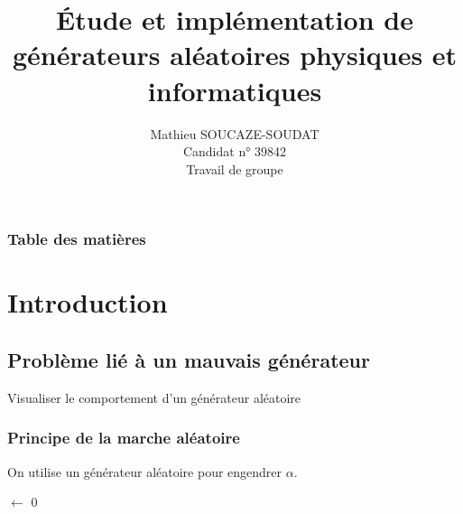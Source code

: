 \documentclass[aspectratio=43]{beamer}
\title{Étude et implémentation de générateurs aléatoires physiques et informatiques}
\author{Mathieu SOUCAZE-SOUDAT\\Candidat n° 39842\\Travail de groupe}
\date{}
\begin{document}
\frame{\titlepage}

\begin{frame}
    \begin{center}
        \frametitle{Table des matières}
        \tableofcontents
    \end {center}
\end{frame}

\section{Introduction}
    \subsection{Problème lié à un mauvais générateur}
    \begin{frame}
        \center
        \Huge
        Visualiser le comportement d'un générateur aléatoire
    \end{frame}
    \begin{frame}
        \frametitle{Principe de la marche aléatoire}
        \center
        On utilise un générateur aléatoire pour engendrer $\alpha$.
        \begin{minipage}{0.5\textwidth}
            \SetAlFnt{\tiny}
            \SetAlCapFnt{\tiny}
            \SetAlCapNameFnt{\tiny}
            \begin{algorithm}[H]
                \tiny
                \caption{\tiny Simulation de mouvement aléatoire} 


                \BlankLine

                \Temps $\leftarrow$ 0\;
                \end{algorithm}
        \end{minipage}
        \hfill
        \begin{minipage}{0.45\textwidth}
            \center
        \end{minipage}
    \end{frame}
\end{document}
